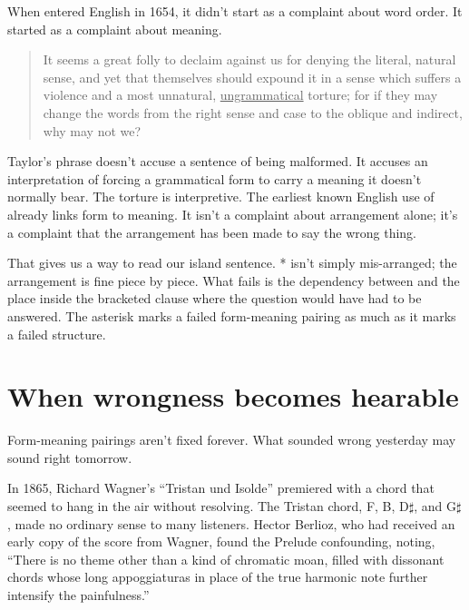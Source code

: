 When  entered English in 1654, it didn't start as a complaint about word order. It started as a complaint about meaning.

\begin{quote}
    It seems a great folly to declaim against us for denying the literal, natural sense, and yet that themselves should expound it in a sense which suffers a violence and a most unnatural, \uline{ungrammatical} torture; for if they may change the words from the right sense and case to the oblique and indirect, why may not we?\hfill\citep{taylor1654real}
\end{quote}

Taylor's phrase doesn't accuse a sentence of being malformed. It accuses an interpretation of forcing a grammatical form to carry a meaning it doesn't normally bear. The torture is interpretive. The earliest known English use of  already links form to meaning. It isn't a complaint about arrangement alone; it's a complaint that the arrangement has been made to say the wrong thing.

That gives us a way to read our island sentence. * isn't simply mis-arranged; the arrangement is fine piece by piece. What fails is the dependency between  and the place inside the bracketed clause where the question would have had to be answered. The asterisk marks a failed form-meaning pairing as much as it marks a failed structure.


\section{When wrongness becomes hearable}

Form-meaning pairings aren't fixed forever. What sounded wrong yesterday may sound right tomorrow.

In 1865, Richard Wagner's \enquote{Tristan und Isolde} premiered with a chord that seemed to hang in the air without resolving. The Tristan chord, F, B, D\(\sharp\), and G\(\sharp\), made no ordinary sense to many listeners. Hector Berlioz, who had received an early copy of the score from Wagner, found the Prelude confounding, noting, \enquote{There is no theme other than a kind of chromatic moan, filled with dissonant chords whose long appoggiaturas in place of the true harmonic note further intensify the painfulness.} %

